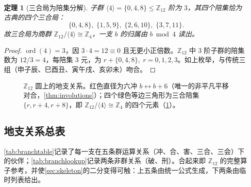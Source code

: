 \documentclass[11pt,a4paper,fontset=none]{ctexart}
\newtheorem{theorem}{定理}[section]
\theoremstyle{definition}
\theoremstyle{remark}
\newcommand{\Z}{\mathbb{Z}}
\newcommand{\ord}{\operatorname{ord}}
\begin{document}
\begin{theorem}[三合局为陪集分解]\label{thm:threeharmony}
子群 $\langle4\rangle=\{0,4,8\}\le\Z_{12}$ 阶为 $3$，其四个陪集恰为古典的四个三合局：
\[
\{0,4,8\},\;\{1,5,9\},\;\{2,6,10\},\;\{3,7,11\}.
\]
故三合局为商群 $\Z_{12}/\langle4\rangle\cong\Z_4$，一支 $b$ 的归属由 $b\bmod 4$ 读出。
\end{theorem}
\begin{proof}
$\ord(4)=3$，因 $3\cdot4=12\equiv0$ 且无更小正倍数。$\Z_{12}$ 中 $3$ 阶子群的陪集数为 $12/3=4$，每陪集 $3$ 元，为 $r+\{0,4,8\},\;r=0,1,2,3$。如上枚举，与传统三组（申子辰、巳酉丑、寅午戌、亥卯未）吻合。
\end{proof}

\begin{figure}[h]\centering
{}
\caption{$\Z_{12}$ 圆上的地支关系。红色直径为六冲 $b\leftrightarrow b{+}6$（唯一的非平凡平移对合，\cref{thm:involutions}）；四个绿色等边三角形为三合陪集 $\{r,r{+}4,r{+}8\}$，即 $\Z_{12}/\langle4\rangle\cong\Z_4$ 的四个元素（\cref{thm:threeharmony}）。}\label{fig:z12}
\end{figure}

\subsection{地支关系总表}\label{sec:branchtable}
\cref{tab:branchtable}记录了每一支在五条群运算关系（冲、合、害、三合、三会）下的伙伴；\cref{tab:branchlookup}记录两条非群关系（破、刑）。合起来即 $\Z_{12}$ 的完整算子参考，并使\cref{sec:skeleton}的二分变得可触：上五条由统一公式生成，下两条由临时列表给出。
\end{document}
